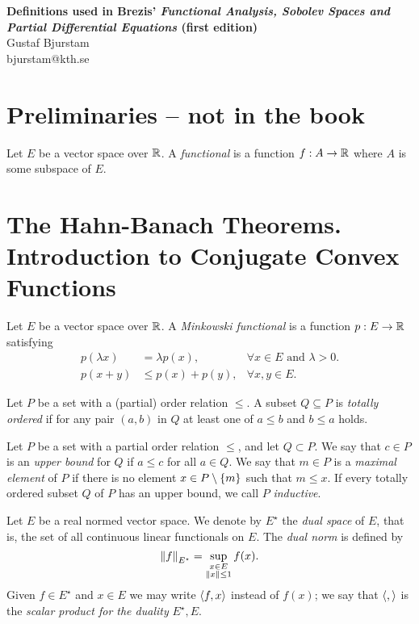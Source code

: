\documentclass[11pt]{article}
\begin{document}
\begin{center}
\textbf{\large Definitions used in Brezis' \textit{Functional Analysis, Sobolev Spaces and Partial Differential Equations} (first edition)} \\
Gustaf Bjurstam\\
bjurstam@kth.se\\
\end{center}
\section*{Preliminaries -- not in the book}
\begin{definition}
    Let $E$ be a vector space over $\mathbb{R}$. A \textit{functional} is a function $f:A\to\mathbb{R}$ where $A$ is some subspace of $E$.
\end{definition}

\section{The Hahn-Banach Theorems. Introduction to Conjugate Convex Functions}
\begin{definition}
    Let $E$ be a vector space over $\mathbb{R}$. A \textit{Minkowski functional} is a function $p:E\to\mathbb{R}$ satisfying
    \begin{align}
        p(\lambda x) &= \lambda p(x), &\forall x\in E \text{ and } \lambda > 0.\\
        p(x+y) &\leq p(x)+p(y), &\forall x,y\in E.
    \end{align}
\end{definition}

\begin{definition}
    Let $P$ be a set with a (partial) order relation $\leq$. A subset $Q\subseteq P$ is \textit{totally ordered} if for any pair $(a,b)$ in $Q$ at least one of $a\leq b$ and $b\leq a$ holds. 
\end{definition}

\begin{definition}
    Let $P$ be a set with a partial order relation $\leq$, and let $Q\subset P$. We say that $c\in P$ is an \textit{upper bound} for $Q$ if $a\leq c$ for all $a\in Q$. We say that $m\in P$ is a \textit{maximal element} of $P$ if there is no element $x\in P\setminus\left\{m\right\}$ such that $m\leq x$. If every totally ordered subset $Q$ of $P$ has an upper bound, we call $P$ \textit{inductive}.
\end{definition}

\begin{definition}
    Let $E$ be a real normed vector space. We denote by $E^\star$ the \textit{dual space} of $E$, that is, the set of all continuous linear functionals on $E$. The \textit{dual norm} is defined by
    \begin{equation*}
        \left\lVert f\right\rVert_{E^\star} = \sup_{\substack{x\in E\\ \left\lVert x\right\rVert \leq 1}} f(x).
    \end{equation*}
    Given $f\in E^\star$ and $x\in E$ we may write $\left\langle f, x\right\rangle$ instead of $f(x)$; we say that $\left\langle, \right\rangle$ is the \textit{scalar product for the duality} $E^\star, E$. 
\end{definition}
\end{document}

